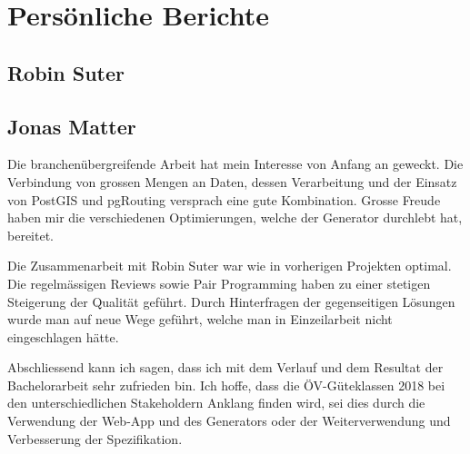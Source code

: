 
\section{Persönliche Berichte}
\label{Persönliche Berichte}

\subsection{Robin Suter}
\label{Persönliche Berichte:Robin Suter}



\subsection{Jonas Matter}
\label{Persönliche Berichte:Jonas Matter}

Die branchenübergreifende Arbeit hat mein Interesse von Anfang an geweckt.
Die Verbindung von grossen Mengen an Daten, dessen Verarbeitung und der Einsatz von PostGIS und pgRouting versprach eine gute Kombination.
Grosse Freude haben mir die verschiedenen Optimierungen, welche der Generator durchlebt hat, bereitet.

Die Zusammenarbeit mit Robin Suter war wie in vorherigen Projekten optimal.
Die regelmässigen Reviews sowie Pair Programming haben zu einer stetigen Steigerung der Qualität geführt.
Durch Hinterfragen der gegenseitigen Lösungen wurde man auf neue Wege geführt, welche man in Einzeilarbeit nicht eingeschlagen hätte.

Abschliessend kann ich sagen, dass ich mit dem Verlauf und dem Resultat der Bachelorarbeit sehr zufrieden bin.
Ich hoffe, dass die ÖV-Güteklassen 2018 bei den unterschiedlichen Stakeholdern Anklang finden wird, sei dies durch die Verwendung der Web-App und des Generators oder der Weiterverwendung und Verbesserung der Spezifikation.
